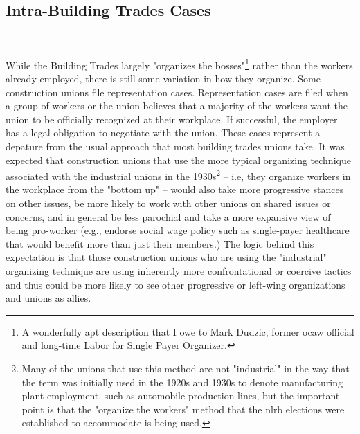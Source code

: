 \documentclass[12pt]{article}
\begin{document}
\subsection{Intra-Building Trades Cases} \

While the Building Trades largely "organizes the bosses"\footnote{A wonderfully apt description that I owe to Mark Dudzic, former \acrshort{ocaw} official and long-time Labor for Single Payer Organizer.} rather than the workers already employed, there is still some variation in how they organize. Some construction unions file representation cases. Representation cases are filed when a group of workers or the union believes that a majority of the workers want the union to be officially recognized at their workplace. If successful, the employer has a legal obligation to negotiate with the union. These cases represent a depature from the usual approach that most building trades unions take. It was expected that construction unions that use the more typical organizing technique associated with the industrial unions in the 1930s\footnote{Many of the unions that use this method are not "industrial" in the way that the term was initially used in the 1920s and 1930s to denote manufacturing plant employment, such as automobile production lines, but the important point is that the "organize the workers" method that the \acrshort{nlrb} elections were established to accommodate is being used.} -- i.e, they organize workers in the workplace from the "bottom up" -- would also take more progressive stances on other issues, be more likely to work with other unions on shared issues or concerns, and in general be less parochial and take a more expansive view of being pro-worker (e.g., endorse social wage policy such as single-payer healthcare that would benefit more than just their members.) The logic behind this expectation is that those construction unions who are using the "industrial" organizing technique are using inherently more confrontational or coercive tactics and thus could be more likely to see other progressive or left-wing organizations and unions as allies.
\end{document}
